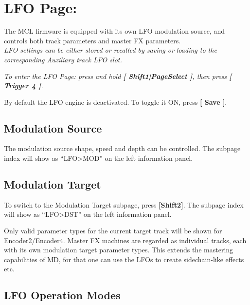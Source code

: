 \chapter{LFO Page:}
The MCL firmware is equipped with its own LFO modulation source, and controls both track parameters and master FX parameters.\\\textit{LFO settings can be either stored or recalled by saving or loading to the corresponding Auxiliary track LFO slot.}

\textit{To enter the LFO Page: press and hold \textbf{[ Shift1|PageSelect ]}, then press \textbf{[ Trigger 4 ]}.}

By default the LFO engine is deactivated. To toggle it ON, press \textbf{[ Save ]}.


\section{Modulation Source}

The modulation source shape, speed and depth can be controlled. The subpage index will show as ``LFO>MOD'' on the left information panel.


\newpage


\section{Modulation Target}
To switch to the Modulation Target subpage, press \textbf{[Shift2]}. The subpage index will show as ``LFO>DST'' on the left information panel.


Only valid parameter types for the current target track will be shown for Encoder2/Encoder4. Master FX machines are regarded as individual tracks, each with its own modulation target parameter types. This extends the mastering capabilities of MD, for that one can use the LFOs to create sidechain-like effects etc.


\section{LFO Operation Modes}

